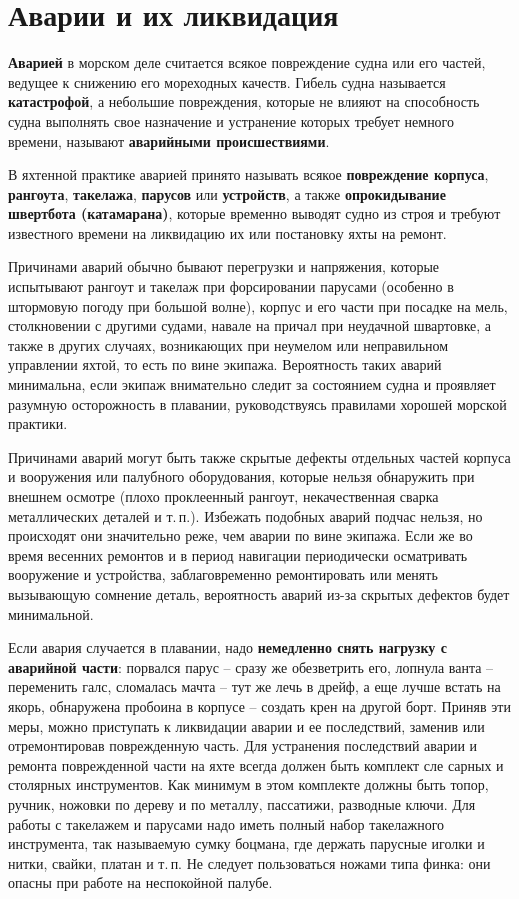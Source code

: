 \documentclass[a4paper, 12pt, twoside, final]{scrbook}
\begin{document}
\section{Аварии и их ликвидация}

\textbf{Аварией} в морском деле считается всякое повреждение судна или его частей, ведущее к снижению его мореходных качеств. Гибель судна называется \textbf{катастрофой}, а небольшие повреждения, которые не влияют на способность судна выполнять свое назначение и устранение которых требует немного времени, называют \textbf{аварийными происшествиями}. 

В яхтенной практике аварией принято называть всякое \textbf{повреждение корпуса}, \textbf{рангоута}, \textbf{такелажа}, \textbf{парусов} или \textbf{устройств}, а также \textbf{опрокидывание швертбота (катамарана)}, которые временно выводят судно из строя и требуют известного времени на ликвидацию их или постановку яхты на ремонт.

Причинами аварий обычно бывают перегрузки и напряжения, которые испытывают рангоут и такелаж при форсировании парусами (особенно в штормовую погоду при большой волне), корпус и его части при посадке на мель, столкновении с другими судами, навале на причал при неудачной швартовке, а также в других случаях, возникающих при неумелом или неправильном управлении яхтой, то есть по вине экипажа. Вероятность таких аварий минимальна, если экипаж внимательно следит за состоянием судна и проявляет разумную осторожность в плавании, руководствуясь правилами хорошей морской практики.

Причинами аварий могут быть также скрытые дефекты отдельных частей корпуса и вооружения или палубного оборудования, которые нельзя обнаружить при внешнем осмотре (плохо проклеенный рангоут, некачественная сварка металлических деталей и т.\,п.). Избежать подобных аварий подчас нельзя, но происходят они значительно реже, чем аварии по вине экипажа. Если же во время весенних ремонтов и в период навигации периодически осматривать вооружение и устройства, заблаговременно ремонтировать или менять вызывающую сомнение деталь, вероятность аварий из-за скрытых дефектов будет минимальной.

Если авария случается в плавании, надо \textbf{немедленно снять нагрузку с аварийной части}: порвался парус \--- сразу же обезветрить его, лопнула ванта \--- переменить галс, сломалась мачта \--- тут же лечь в дрейф, а еще лучше встать на якорь, обнаружена пробоина в корпусе \--- создать крен на другой борт. Приняв эти меры, можно приступать к ликвидации аварии и ее последствий, заменив или отремонтировав поврежденную часть. Для устранения последствий аварии и ремонта поврежденной части на яхте всегда должен быть комплект сле сарных и столярных инструментов. Как минимум в этом комплекте должны быть топор, ручник, ножовки по дереву и по металлу, пассатижи, разводные ключи. Для работы с такелажем и парусами надо иметь полный набор такелажного инструмента, так называемую сумку боцмана, где держать парусные иголки и нитки, свайки, платан и т.\,п. Не следует пользоваться ножами типа финка: они опасны при работе на неспокойной палубе.
\end{document}
